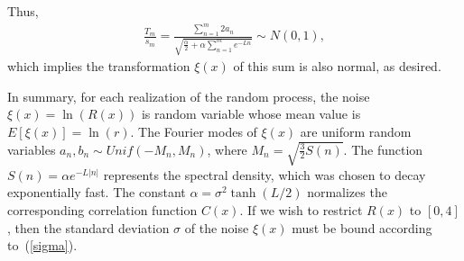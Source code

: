Thus, 
\begin{align*}
\frac{T_m}{s_m} = \frac{\sum_{n=1}^{m} 2a_n}{\sqrt{\frac{\alpha}{2} +\alpha\sum_{n=1}^m e^{-Ln}}} \sim N(0,1),
\end{align*}
which implies the transformation $\xi(x)$ of this sum is also normal,
as desired.  

In summary, for each realization of the random process, the noise
$\xi(x)=\ln(R(x))$ is random variable whose mean value is
$E[\xi(x)]=\ln(r)$. The Fourier modes of $\xi(x)$ are uniform random
variables $a_n,b_n \sim Unif(-M_n,M_n)$, where $M_n=
\sqrt{\frac{3}{2}S(n)}$. The function $S(n)=\alpha e^{-L|n|}$
represents the spectral density, which was chosen to decay exponentially fast. The constant $\alpha = \sigma^2 \tanh(L/2)$ normalizes the corresponding
correlation function $C(x)$. If we wish to restrict $R(x)$
to $[0,4]$, then the standard deviation $\sigma$ of
the noise $\xi(x)$ must be bound according to~(\ref{sigma}). 

